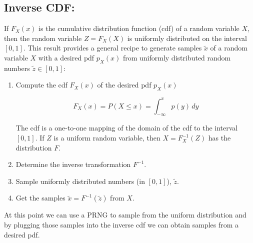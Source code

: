 \subsection{Inverse CDF:}

If $F_{X}(x)$ is the cumulative
  distribution function (cdf) of a random variable $X$, then the
random variable $Z = F_{X}(X)$ is uniformly distributed on the
interval $[0,1]$. This result provides 
a general recipe to generate
samples $\tilde x$ of a random variable $X$ with a desired pdf $p_X(x)$
from uniformly distributed random numbers $\tilde z \in [0,1]$:
\begin{enumerate}
\item Compute the cdf $F_X(x)$ of the desired pdf $p_X(x)$

\begin{equation}
F_X(x) = P(X \leq x) = \int_{-\infty}^{x} p(y)\,dy
\end{equation}

The cdf is a one-to-one mapping of the domain of the cdf to the interval $[0,1]$.
 If $Z$ is a uniform random variable, then $X=F_X^{-1}(Z)$ has the distribution $F$.

\item Determine the inverse transformation $F^{-1}$.

\item Sample uniformly distributed numbers (in $[0,1]$), $\tilde z$.
\item Get the samples $\tilde x=F^{-1}(\tilde z)$ from $X$. 
\end{enumerate}

At this point we can use a PRNG to sample from the uniform distribution and 
by plugging those samples into the inverse cdf we can obtain samples from a desired pdf.
